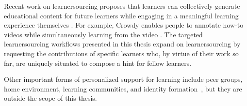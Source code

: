 Recent work on learnersourcing proposes that learners can collectively generate educational content for future learners while engaging in a meaningful learning experience themselves \cite{kim2013learnersourcing,weir2015,mitros2015}. For example, Crowdy enables people to annotate how-to videos while simultaneously learning from the video \cite{weir2015}. The targeted learnersourcing workflows presented in this thesis expand on learnersourcing by requesting the contributions of specific learners who, by virtue of their work so far, are uniquely situated to compose a hint for fellow learners. %

Other important forms of personalized support for learning include peer groups, home environment, learning communities, and identity formation~\cite{walberg1984improving,case2008education}, but they are outside the scope of this thesis.



\begin{comment}
\section{Augmented Intelligence}
     "The power of the unaided mind is highly overrated… The real powers come from devising external aids that enhance cognitive abilities. " —Donald Norman 
     http://www.dougengelbart.org/pubs/augment-3906.html
\end{comment}